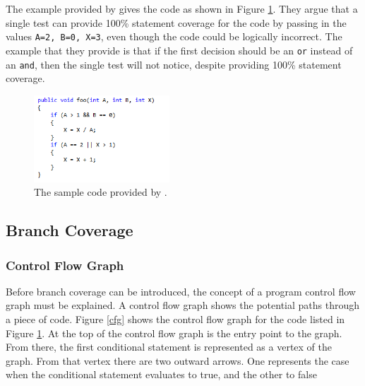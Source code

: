 The example provided by \citet{Myers:2004:AST:983238} gives the code as shown in Figure \ref{codeCoverage}. They argue that a single test can provide 100\% statement coverage for the code by passing in the values \verb+A=2, B=0, X=3+, even though the code could be logically incorrect. The example that they provide is that if the first decision should be an \verb+or+ instead of an \verb+and+, then the single test will not notice, despite providing 100\% statement coverage.

\begin{figure}[h]
	\begin{center}
		\includegraphics[width=2in]{figures/code_coverage.png}
	\end{center}
\caption{The sample code provided by \citet{Myers:2004:AST:983238}.}
\label{codeCoverage}
\end{figure}

\subsection{Branch Coverage}

\subsubsection{Control Flow Graph}

Before branch coverage can be introduced, the concept of a program control flow graph must be explained. A control flow graph shows the potential paths through a piece of code. Figure \ref{cfg} shows the control flow graph for the code listed in Figure \ref{codeCoverage}. At the top of the control flow graph is the entry point to the graph. From there, the first conditional statement is represented as a vertex of the graph. From that vertex there are two outward arrows. One represents the case when the conditional statement evaluates to true, and the other to false \citep{Myers:2004:AST:983238}

